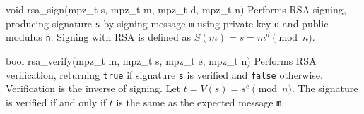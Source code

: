 \begin{funcdoc}{void rsa\_sign(mpz\_t s, mpz\_t m, mpz\_t d, mpz\_t
n)}
  Performs RSA signing, producing signature \texttt{s} by signing
  message \texttt{m} using private key \texttt{d} and public modulus
        \texttt{n}. Signing with RSA is defined as $S(m) = s = m^d \pmod{n}$.
\end{funcdoc}

\begin{funcdoc}{bool rsa\_verify(mpz\_t m, mpz\_t s, mpz\_t e,
mpz\_t n)}
  Performs RSA verification, returning \texttt{true} if signature
  \texttt{s} is verified and \texttt{false} otherwise. Verification is
        the inverse of signing. Let $t = V(s) = s^e \pmod{n}$. The signature is
  verified if and only if $t$ is the same as the expected message
  \texttt{m}.
\end{funcdoc}
